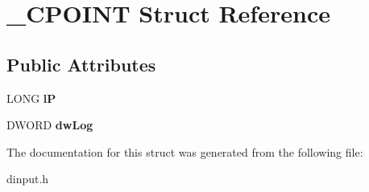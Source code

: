 \hypertarget{struct___c_p_o_i_n_t}{\section{\-\_\-\-C\-P\-O\-I\-N\-T Struct Reference}
\label{struct___c_p_o_i_n_t}
}
\subsection*{Public Attributes}
\begin{DoxyCompactItemize}
\item 
\hypertarget{struct___c_p_o_i_n_t_a1bf51a0cb980c1e90cee27cc328eb1a2}{L\-O\-N\-G {\bfseries l\-P}}\label{struct___c_p_o_i_n_t_a1bf51a0cb980c1e90cee27cc328eb1a2}

\item 
\hypertarget{struct___c_p_o_i_n_t_ae54f263369bc2961159b78a432114fff}{D\-W\-O\-R\-D {\bfseries dw\-Log}}\label{struct___c_p_o_i_n_t_ae54f263369bc2961159b78a432114fff}

\end{DoxyCompactItemize}


The documentation for this struct was generated from the following file\-:\begin{DoxyCompactItemize}
\item 
dinput.\-h\end{DoxyCompactItemize}
